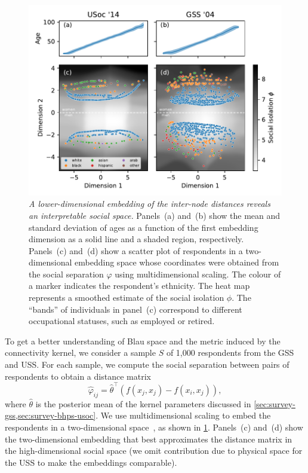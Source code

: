 \documentclass{scrartcl}
\newcommand{\transpose}[1]{#1^\intercal}
\newcommand{\titlecaption}[2]{\caption[#1]{\emph{#1} #2}}
\begin{document}
\begin{figure}
    \includegraphics{embedding}
    \titlecaption{A lower-dimensional embedding of the inter-node distances reveals an interpretable social space.}{Panels~(a) and~(b) show the mean and standard deviation of ages as a function of the first embedding dimension as a solid line and a shaded region, respectively. Panels~(c) and~(d) show a scatter plot of respondents in a two-dimensional embedding space whose coordinates were obtained from the social separation $\varphi$ using multidimensional scaling. The colour of a marker indicates the respondent's ethnicity. The heat map represents a smoothed estimate of the social isolation $\phi$. The ``bands'' of individuals in panel~(c) correspond to different occupational statuses, such as employed or retired.\label{fig:segregation-embedding}}
\end{figure}

To get a better understanding of Blau space and the metric induced by the connectivity kernel, we consider a sample $S$ of 1,000 respondents from the GSS and USS. For each sample, we compute the social separation between pairs of respondents to obtain a distance matrix
\[
    \hat\varphi_{ij} = \transpose{\hat\theta}\left(f(x_j, x_j)-f(x_i, x_j)\right),
\]
where $\hat\theta$ is the posterior mean of the kernel parameters discussed in \cref{sec:survey-gss,sec:survey-bhps-usoc}. We use multidimensional scaling to embed the respondents in a two-dimensional space~\cite{Borg1996}, as shown in \cref{fig:segregation-embedding}. Panels~(c) and~(d) show the two-dimensional embedding that best approximates the distance matrix in the high-dimensional social space (we omit contribution due to physical space for the USS to make the embeddings comparable).
\end{document}
